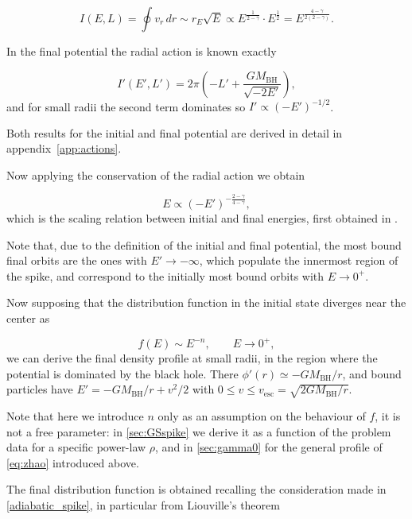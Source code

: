 \begin{equation}
I(E,L) = \oint v_r \, dr \sim r_E \sqrt{E} \propto E^{\frac{1}{2-\gamma}} \cdot E^{\frac{1}{2}} = E^{\frac{4-\gamma}{2(2-\gamma)}}.
\end{equation}


In the final potential the radial action is known exactly 

\begin{equation}
I'(E',L') = 2\pi \left( -L' + \frac{GM_{\mathrm{BH}}}{\sqrt{-2E'}} \right),
\end{equation}
and for small radii the second term dominates so 
$I' \propto (-E')^{-1/2}$.

Both results for the initial and final potential are derived in detail in appendix~\ref{app:actions}.

Now applying the conservation of the radial action we obtain

\begin{equation} \label{eq:energymap}
E \propto (-E')^{-\frac{2-\gamma}{4-\gamma}},
\end{equation}
which is the scaling relation between initial and final energies, first
obtained in \cite{Quinlan_1995}.

Note that, due to the definition of the initial and final potential, the
most bound final orbits are the ones with $E' \to -\infty$, which
populate the innermost region of the spike, and correspond to the initially
most bound orbits with $E \to 0^{+}$.

Now supposing that the distribution 
function in the initial state diverges near the center as

\begin{equation} \label{eq:fdiv}
f(E) \sim E^{-n}, \qquad E \to 0^{+},
\end{equation}
we can derive the final density profile at small radii, in the region
where the potential is dominated by the black hole. There
$\phi'(r) \simeq -GM_{\mathrm{BH}}/r$, and bound particles have
$E' = -GM_{\mathrm{BH}}/r + v^2/2$ with $0 \le v \le v_{\mathrm{esc}} =
\sqrt{2GM_{\mathrm{BH}}/r}$.

Note that here we introduce $n$ only as an assumption on the behaviour of
$f$, it is not a free parameter: in \cref{sec:GSspike} we derive it as a
function of the problem data for a specific power-law $\rho$, and in
\cref{sec:gamma0} for the general profile of \cref{eq:zhao} introduced above.


The final distribution function is obtained recalling the consideration
made in \cref{adiabatic_spike}, in particular from Liouville's theorem

